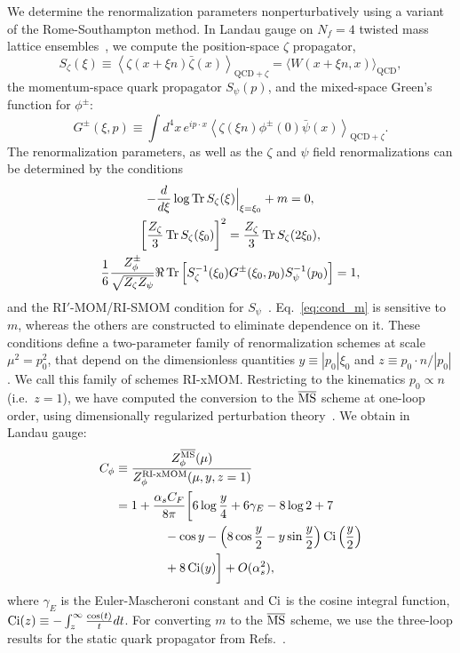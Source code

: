 We determine the renormalization parameters nonperturbatively using a
variant of the Rome-Southampton method. In Landau gauge on $N_f=4$
twisted mass lattice ensembles~\cite{Alexandrou:2015sea}, we compute
the position-space $\zeta$ propagator,
\begin{equation}
  S_\zeta(\xi) \equiv \left\langle \zeta(x+\xi n)\bar\zeta(x)\right\rangle_{\text{QCD}+\zeta}
  = \bigl\langle W(x+\xi n,x)\bigr\rangle_\text{QCD},
\end{equation}
the momentum-space quark propagator $S_\psi(p)$, and the mixed-space
Green's function for $\phi^\pm$:
\begin{equation}
  G^\pm(\xi,p) \equiv
  \int d^4x\, e^{ip\cdot x}\left\langle
  \zeta(\xi n)\phi^{\pm}(0)\bar\psi(x)\right\rangle_{\text{QCD}+\zeta}.
\end{equation}
The renormalization parameters, as well as the $\zeta$ and $\psi$
field renormalizations can be determined by the conditions
\begin{gather}
  -\frac{d}{d\xi}\log\operatorname{Tr} S_\zeta(\xi)\Bigr|_{\xi=\xi_0} + m=0,\label{eq:cond_m}\\
\left[\frac{Z_\zeta}{3}\operatorname{Tr} S_\zeta(\xi_0)\right]^2=\frac{Z_\zeta}{3}\operatorname{Tr} S_\zeta(2\xi_0),\label{eq:cond_zeta}\\
\frac{1}{6}\frac{Z_\phi^\pm}{\sqrt{Z_\zeta Z_\psi}}\Re\operatorname{Tr}\left[S_\zeta^{-1}(\xi_0)G^\pm(\xi_0,p_0)S_\psi^{-1}(p_0)\right]=1,\label{eq:cond_phi}
\end{gather}
and the RI$'$-MOM/RI-SMOM condition for
$S_\psi$~\cite{Martinelli:1994ty,Sturm:2009kb}. Eq.~\eqref{eq:cond_m}
is sensitive
to $m$, whereas the others are constructed to eliminate dependence on
it.  These conditions define a two-parameter family of renormalization
schemes at scale $\mu^2=p_0^2$, that depend on the dimensionless
quantities $y\equiv|p_0|\xi_0$ and $z\equiv p_0\cdot
n/|p_0|$. We call this family of schemes RI-xMOM.
Restricting to the kinematics $p_0\propto n$ (i.e.\ $z=1$),
we have computed the conversion to the $\overline{\text{MS}}$ scheme at one-loop
order, using dimensionally regularized perturbation
theory~\cite{Green_forthcoming}. We obtain in Landau gauge:
\begin{equation}
\begin{aligned}\label{eq:conversion}
   C_\phi &\equiv \frac{Z_\phi^{\overline{\text{MS}}}(\mu)}{Z_\phi^\text{RI-xMOM}(\mu,y,z=1)} \\
&= 1
+ \frac{\alpha_s C_F}{8\pi}\biggl[
  6\log\frac{y}{4}
  + 6\gamma_E - 8\log 2 + 7 \\
&\qquad\qquad - \cos y - \left(8\cos\frac{y}{2} - y\sin\frac{y}{2}\right)
\operatorname{Ci}\left(\frac{y}{2}\right) \\
&\qquad\qquad + 8\operatorname{Ci}(y)\biggr] + O(\alpha_s^2),
\end{aligned}
\end{equation}
where $\gamma_E$ is the Euler-Mascheroni constant and $\operatorname{Ci}$ is the
cosine integral function, $\operatorname{Ci}(z) \equiv -\int_z^\infty
\frac{\cos(t)}{t} dt$. For converting $m$ to the $\overline{\text{MS}}$ scheme, we
use the three-loop results for the static quark propagator from
Refs.~\cite{Chetyrkin:2003vi,Melnikov:2000zc}.

